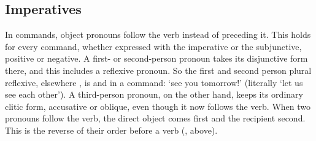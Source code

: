 \subsection{Imperatives}\label{sec:imperative-pronouns}
In commands, object pronouns follow the verb instead of preceding it. This holds for every command, whether expressed with the imperative or the subjunctive, positive or negative. A first- or second-person pronoun takes its disjunctive form there, and this includes a reflexive pronoun. So the first and second person plural reflexive, elsewhere , is  and  in a command:  `see you tomorrow!' (literally `let us see each other').
A third-person pronoun, on the other hand, keeps its ordinary clitic form, accusative or oblique, even though it now follows the verb. When two pronouns follow the verb, the direct object comes first and the recipient second. This is the reverse of their order before a verb (, above).

